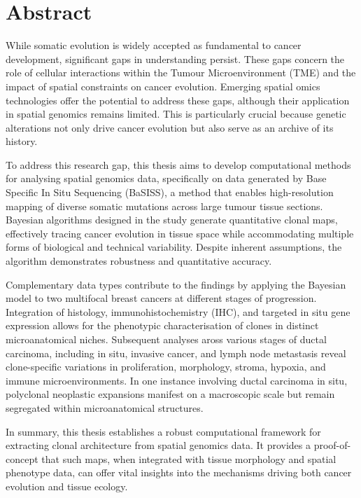 \chapter*{Abstract}

While somatic evolution is widely accepted as fundamental to cancer development, significant gaps in understanding persist. These gaps concern the role of cellular interactions within the Tumour Microenvironment (TME) and the impact of spatial constraints on cancer evolution. Emerging spatial omics technologies offer the potential to address these gaps, although their application in spatial genomics remains limited. This is particularly crucial because genetic alterations not only drive cancer evolution but also serve as an archive of its history.

To address this research gap, this thesis aims to develop computational methods for analysing spatial genomics data, specifically on data generated by Base Specific In Situ Sequencing (BaSISS), a method that enables high-resolution mapping of diverse somatic mutations across large tumour tissue sections. Bayesian algorithms designed in the study generate quantitative clonal maps, effectively tracing cancer evolution in tissue space while accommodating multiple forms of biological and technical variability. Despite inherent assumptions, the algorithm demonstrates robustness and quantitative accuracy.

Complementary data types contribute to the findings by applying the Bayesian model to two multifocal breast cancers at different stages of progression. Integration of histology, immunohistochemistry (IHC), and targeted in situ gene expression allows for the phenotypic characterisation of clones in distinct microanatomical niches. Subsequent analyses aross various stages of ductal carcinoma, including in situ, invasive cancer, and lymph node metastasis reveal clone-specific variations in proliferation, morphology, stroma, hypoxia, and immune microenvironments. In one instance involving ductal carcinoma in situ, polyclonal neoplastic expansions manifest on a macroscopic scale but remain segregated within microanatomical structures. 

In summary, this thesis establishes a robust computational framework for extracting clonal architecture from spatial genomics data. It provides a proof-of-concept that such maps, when integrated with tissue morphology and spatial phenotype data, can offer vital insights into the mechanisms driving both cancer evolution and tissue ecology.




